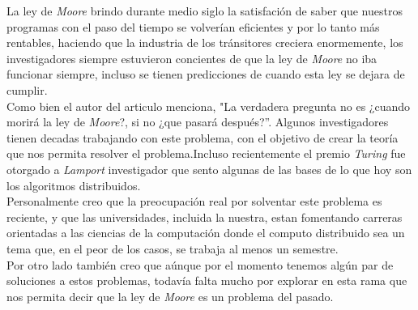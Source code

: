 \documentclass{article}
\begin{document}
\begin{enumerate}
{    La ley de \textit{Moore} brindo durante medio siglo la satisfación
    de saber que nuestros programas con el paso del tiempo se volverían
    eficientes y por lo tanto más rentables, haciendo que la industria
    de los tránsitores creciera enormemente, los investigadores
    siempre estuvieron concientes de que la ley de \textit{Moore} no
    iba funcionar siempre, incluso se tienen predicciones de cuando
    esta ley se dejara de cumplir.\\
    Como bien el autor del articulo menciona, "La verdadera pregunta no
    es ¿cuando morirá la ley de \textit{Moore}?, si no ¿que pasará
    después?''. Algunos investigadores tienen decadas trabajando con
    este problema, con el objetivo de crear la teoría que nos permita
    resolver el problema.Incluso recientemente el premio
    \textit{Turing} fue otorgado a \textit{Lamport} investigador que
    sento algunas de las bases de lo que hoy son los algoritmos
    distribuidos.\\ 
    Personalmente creo que la preocupación real por solventar este
    problema es reciente, y que las universidades, incluida la
    nuestra, estan fomentando carreras orientadas a las ciencias de la
    computación donde el computo distribuido sea un tema que, en el
    peor de los casos, se trabaja  al menos un semestre.\\
    Por otro lado también creo que aúnque por el momento tenemos algún
    par de soluciones a estos problemas, todavía falta mucho por
    explorar en esta rama que nos permita decir que la ley de
    \textit{Moore} es un problema del pasado.
  }
  
\end{enumerate}
\end{document}
